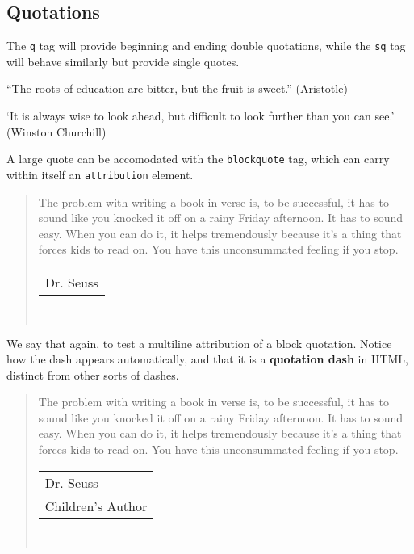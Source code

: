 \documentclass[10pt,]{article}
\newcommand{\terminology}[1]{\textbf{#1}}
\theoremstyle{plain}
\theoremstyle{definition}
\theoremstyle{definition}
\theoremstyle{definition}
\theoremstyle{definition}
\theoremstyle{definition}
\theoremstyle{definition}
\numberwithin{equation}{section}
\begin{document}
\subsection[{Quotations}]{Quotations}\label{subsection-15}
\hypertarget{p-230}{}%
The \lstinline?q? tag will provide beginning and ending double quotations, while the \lstinline?sq? tag will behave similarly but provide single quotes.%
\par
\hypertarget{p-231}{}%
``The roots of education are bitter, but the fruit is sweet.'' (Aristotle)%
\par
\hypertarget{p-232}{}%
`It is always wise to look ahead, but difficult to look further than you can see.' (Winston Churchill)%
\par
\hypertarget{p-233}{}%
A large quote can be accomodated with the \lstinline?blockquote? tag, which can carry within itself an \lstinline?attribution? element.%
\begin{quote}\hypertarget{blockquote-seuss}{}
\hypertarget{p-234}{}%
The problem with writing a book in verse is, to be successful, it has to sound like you knocked it off on a rainy Friday afternoon. It has to sound easy. When you can do it, it helps tremendously because it's a thing that forces kids to read on. You have this unconsummated feeling if you stop.%
\par\hfill\begin{tabular}{l@{}}
\textemdash{}Dr. Seuss
\end{tabular}\\\par
\end{quote}
\hypertarget{p-235}{}%
We say that again, to test a multiline attribution of a block quotation.  Notice how the dash appears automatically, and that it is a \terminology{quotation dash} in HTML, distinct from other sorts of dashes.%
\begin{quote}\hypertarget{blockquote-4}{}
\hypertarget{p-236}{}%
The problem with writing a book in verse is, to be successful, it has to sound like you knocked it off on a rainy Friday afternoon. It has to sound easy. When you can do it, it helps tremendously because it's a thing that forces kids to read on. You have this unconsummated feeling if you stop.%
\par\hfill\begin{tabular}{l@{}}
\textemdash{}Dr. Seuss\\
Children's Author
\end{tabular}\\\par
\end{quote}
\end{document}
